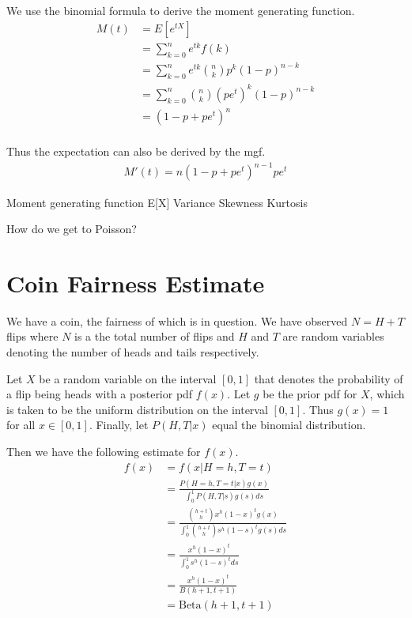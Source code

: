\documentclass{article}
\begin{document}
We use the binomial formula to derive the moment generating function.
\begin{align*}
  M(t) &= E[e^{tX}]\\
  &=\sum_{k=0}^n e^{tk} f(k)\\
  &=\sum_{k=0}^n e^{tk} {n \choose k} p^k (1-p)^{n-k}\\
  &=\sum_{k=0}^n {n \choose k} (pe^t)^k (1-p)^{n-k}\\
  &=(1-p+pe^t)^n\\
\end{align*}

Thus the expectation can also be derived by the mgf.
\begin{align*}
  M'(t)=n(1-p+pe^t)^{n-1}pe^t
\end{align*}



Moment generating function
E[X]
Variance
Skewness
Kurtosis

How do we get to Poisson?

\section{Coin Fairness Estimate}

We have a coin, the fairness of which is in question. We have observed $N=H+T$ flips where $N$ is a the total number of flips and $H$ and $T$ are random variables denoting the number of heads and tails respectively. 


Let $X$ be a random variable on the interval $[0,1]$ that denotes the probability of a flip being heads with a posterior pdf $f(x)$. Let $g$ be the prior pdf for $X$, which is taken to be the uniform distribution on the interval $[0,1]$. Thus $g(x)=1$ for all $x\in[0,1]$. Finally, let $P(H,T|x)$ equal the binomial distribution.

Then we have the following estimate for $f(x)$.
\begin{align*}
f(x) &= \displaystyle f(x|H=h,T=t) \\[1em]
     &= \displaystyle \frac{\displaystyle P(H=h,T=t|x)g(x)}{\displaystyle \int_0^1 P(H,T|s)g(s)ds} \\[1em]
     &= \displaystyle \frac{\displaystyle {h+t \choose h} x^h (1-x)^t g(x)}{\displaystyle \int_0^1 {h+t \choose h} s^h (1-s)^tg(s)ds} \\[1em] 
     &= \displaystyle \frac{\displaystyle x^h (1-x)^t}{\displaystyle \int_0^1 s^h (1-s)^tds} \\[1em] 
     &= \displaystyle \frac{\displaystyle x^h (1-x)^t}{\displaystyle B(h+1,t+1)} \\[1em] 
     &= \text{Beta}(h+1,t+1)
\end{align*}
\end{document}

